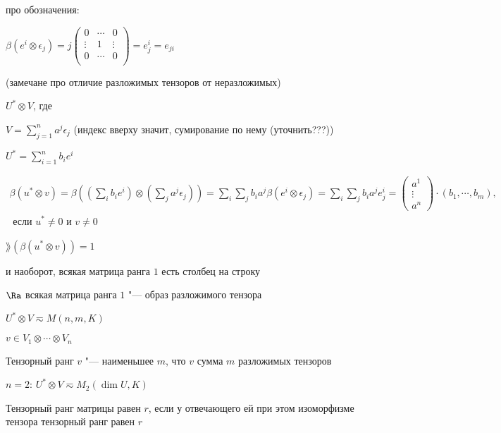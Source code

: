 \begin{Rem} про обозначения:

    $\beta(e^i \otimes \epsilon_j) = j \begin{pmatrix}
        0 & \cdots & 0 \\
        \vdots & 1 & \vdots \\
        0 & \cdots & 0 \\
        \end{pmatrix} = e_j^i = e_{ji}$
\end{Rem}

\begin{Rem}
    (замечане про отличие разложимых тензоров от неразложимых)

    $U^* \otimes V$, где 

    $V = \sum^n_{j=1} a^j \epsilon_j$ (индекс вверху значит, сумирование по нему (уточнить???))

    $U^* = \sum^n_{i=1}b_ie^i$

	\begin{gather*}\beta(u^*\otimes v) = 
            \beta((\sum_i b_i e^i)\otimes(\sum_j a^j \epsilon_j)) = 
            \sum_i\sum_j b_i a^j \beta(e^i\otimes\epsilon_j) =
            \sum_i\sum_j b_i a^j e_j^i = 
            \begin{pmatrix}
            a^1 \\
            \vdots \\
            a^n
			\end{pmatrix} \cdot (b_1, \cdots, b_m),\\ \text{ если $u^* \neq 0$ и $v \neq 0$}
	\end{gather*}

    $\rang(\beta(u^* \otimes v)) = 1$

    и наоборот, всякая матрица ранга $1$ есть столбец на строку

    $\Ra$ всякая матрица ранга $1$ "--- образ разложимого тензора

    $U^* \otimes V \eqsim M(n,m, K)$
\end{Rem}

\begin{Def}
    $v \in V_1 \otimes \cdots \otimes V_n$

    Тензорный ранг $v$ "--- наименьшее $m$, что $v$ сумма $m$ разложимых тензоров
\end{Def}

$n = 2$: $U^* \otimes V \eqsim M_2(\dim U, K)$

Тензорный ранг матрицы равен $r$, если у отвечающего ей при этом изоморфизме тензора тензорный ранг равен $r$

